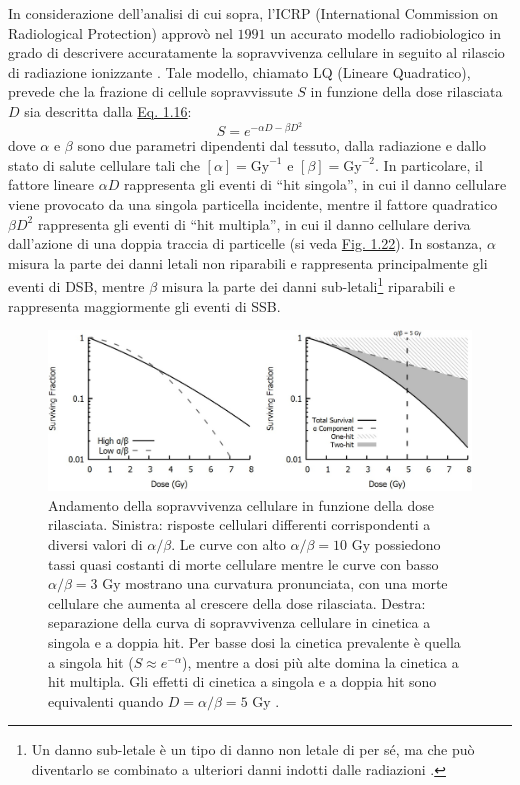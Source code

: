 \documentclass[12pt,a4paper,twoside]{report}
\begin{document}
	In considerazione dell'analisi di cui sopra, l'ICRP (International Commission on Radiological Protection) approvò nel $1991$ un accurato modello radiobiologico in grado di descrivere accuratamente la sopravvivenza cellulare in seguito al rilascio di radiazione ionizzante \cite{icrpAnn}. Tale modello, chiamato LQ (Lineare Quadratico), prevede che la frazione di cellule sopravvissute $S$ in funzione della dose rilasciata $D$ sia descritta dalla \hyperref[eq:survival2]{Eq. 1.16}:
	\begin{equation}
		S=e^{-\alpha D-\beta D^2}
		\label{eq:survival2}
	\end{equation}
	dove $\alpha$ e $\beta$ sono due parametri dipendenti dal tessuto, dalla radiazione e dallo stato di salute cellulare tali che $\left[\alpha\right]=\mbox{Gy}^{-1}$ e $\left[\beta\right]=\mbox{Gy}^{-2}$. In particolare, il fattore lineare $\alpha D$ rappresenta gli eventi di ``hit singola'', in cui il danno cellulare viene provocato da una singola particella incidente, mentre il fattore quadratico $\beta D^2$ rappresenta gli eventi di ``hit multipla'', in cui il danno cellulare deriva dall'azione di una doppia traccia di particelle (si veda \hyperref[fig:survival_cell]{Fig. 1.22}). In sostanza, $\alpha$ misura la parte dei danni letali non riparabili e rappresenta principalmente gli eventi di DSB, mentre $\beta$ misura la parte dei danni sub-letali\footnote{Un danno sub-letale è un tipo di danno non letale di per sé, ma che può diventarlo se combinato a ulteriori danni indotti dalle radiazioni \cite{McMahon_2019}.} riparabili e rappresenta maggiormente gli eventi di SSB.
	\begin{figure}[H]
		\centering
		\includegraphics[width=0.9\linewidth]{survival_cell.jpg}
		\caption{Andamento della sopravvivenza cellulare in funzione della dose rilasciata. Sinistra: risposte cellulari differenti corrispondenti a diversi valori di $\alpha/\beta$. Le curve con alto $\alpha/\beta=10\mbox{ Gy}$ possiedono tassi quasi costanti di morte cellulare mentre le curve con basso $\alpha/\beta=3\mbox{ Gy}$ mostrano una curvatura pronunciata, con una morte cellulare che aumenta al crescere della dose rilasciata. Destra: separazione della curva di sopravvivenza cellulare in cinetica a singola e a doppia hit. Per basse dosi la cinetica prevalente è quella a singola hit ($S\approx e^{-\alpha}$), mentre a dosi più alte domina la cinetica a hit multipla. Gli effetti di cinetica a singola e a doppia hit sono equivalenti quando $D=\alpha/\beta=5\mbox{ Gy}$ \cite{McMahon_2019}.}
		\label{fig:survival_cell}
	\end{figure}
\end{document}
